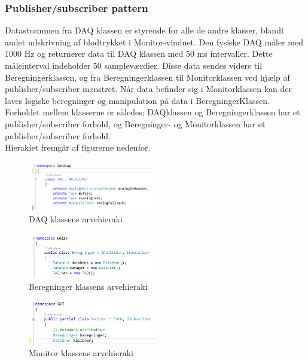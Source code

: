 \subsubsection{Publisher/subscriber pattern}
Datastrømmen fra DAQ klassen er styrende for alle de andre klasser, blandt andet udskrivning af blodtrykket i Monitor-vinduet. Den fysiske DAQ måler med 1000 Hz og returnerer data til DAQ klassen med 50 ms intervaller. Dette måleinterval indeholder 50 sampleværdier. Disse data sendes videre til Beregningerklassen, og fra Beregningerklassen til Monitorklassen ved hjælp af publisher/subscriber mønstret. Når data befinder sig i Monitorklassen kan der laves logiske beregninger og manipulation på data i BeregningerKlassen.
Forholdet mellem klasserne er således; DAQklassen og Beregningerklassen har et publisher/subscriber forhold, og  Beregninger- og Monitorklassen har et publisher/subscriber forhold. \\
Hierakiet fremgår af figurerne nedenfor.
\begin{figure}[H]
	\centering
	\includegraphics[width=0.5\textwidth]{Figurer/DAQ_pub}
	\caption{DAQ klassens arvehieraki}
\end{figure}

\begin{figure}[H]
	\centering
	\includegraphics[width=0.5\textwidth]{Figurer/Beregninger_subpub}
	\caption{Beregninger klassens arvehieraki}
\end{figure}

\begin{figure}[H]
	\centering
	\includegraphics[width=0.5\textwidth]{Figurer/Monitor_sub}
	\caption{Monitor klassens arvehieraki}
\end{figure}


